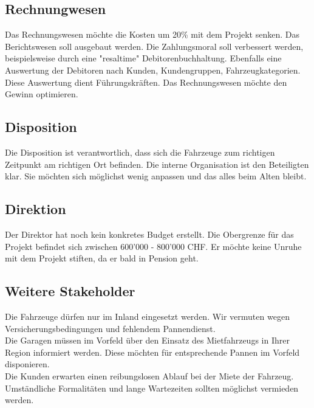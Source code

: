 \subsection{Rechnungwesen}
Das Rechnungswesen möchte die Kosten um 20\% mit dem Projekt senken. Das Berichtswesen soll ausgebaut werden. Die Zahlungsmoral soll verbessert werden, beispielsweise durch eine "resaltime" Debitorenbuchhaltung. Ebenfalls eine Auswertung der Debitoren nach Kunden, Kundengruppen, Fahrzeugkategorien. Diese Auswertung dient Führungskräften. Das Rechnungswesen möchte den Gewinn optimieren.

\subsection{Disposition}
Die Disposition ist verantwortlich, dass sich die Fahrzeuge zum richtigen Zeitpunkt am richtigen Ort befinden. Die interne Organisation ist den Beteiligten klar. Sie möchten sich möglichst wenig anpassen und das alles beim Alten bleibt. 

\subsection{Direktion}
Der Direktor hat noch kein konkretes Budget erstellt. Die Obergrenze für das Projekt befindet sich zwischen 600'000 - 800'000 CHF. Er möchte keine Unruhe mit dem Projekt stiften, da er bald in Pension geht.

\subsection{Weitere Stakeholder}
Die Fahrzeuge dürfen nur im Inland eingesetzt werden. Wir vermuten wegen Versicherungsbedingungen und fehlendem Pannendienst. \\
Die Garagen müssen im Vorfeld über den Einsatz des Mietfahrzeugs in Ihrer Region informiert werden. Diese möchten für entsprechende Pannen im Vorfeld disponieren. \\
Die Kunden erwarten einen reibungslosen Ablauf bei der Miete der Fahrzeug. Umständliche Formalitäten und lange Wartezeiten sollten möglichst vermieden werden.